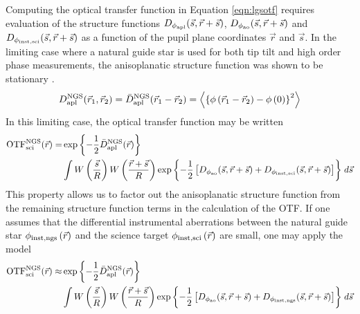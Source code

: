 Computing the optical transfer function in Equation \ref{eqn:lgsotf}
requires evaluation of the structure functions 
$D_{\rm \phi_{apl}}(\vec{s},\vec{r} + \vec{s})$, 
$D_{\rm \phi_{ao}}(\vec{s},\vec{r} + \vec{s})$ and
$D_{\rm \phi_{inst,sci}}(\vec{s},\vec{r} + \vec{s})$ as
a function of the pupil plane coordinates $\vec{r}$ and
$\vec{s}$.  In the limiting case where a natural
guide star is used for both tip tilt and high order phase
measurements, the anisoplanatic structure function was shown to be 
stationary \cite{Britton:2006}.
\begin{equation}
D^{\rm NGS}_{\rm apl}(\vec{r}_{1},\vec{r}_{2}) = 
\bar{D}^{\rm NGS}_{\rm apl}(\vec{r}_{1} - \vec{r}_{2}) =
\left\langle \left\{\phi\left(\vec{r}_{1} - \vec{r}_{2}\right) - 
\phi\left(0\right)\right\}^{2}\right\rangle
\end{equation}
In this limiting case, the optical transfer function may be written 
\begin{equation}\label{eqn:ngsotf}
\begin{aligned}
{\rm OTF}^{\rm NGS}_{\rm sci}(\vec{r}) = 
& \exp{ \left\{ -\frac{1}{2} \bar{D}^{\rm NGS}_{\rm apl}(\vec{r}) \right\} }  \\
& \int 
W \left( \frac{\vec{s}}{R} \right)
W \left( \frac{\vec{r}+\vec{s}}{R} \right) 
\exp{ \left\{ -\frac{1}{2} 
\left[
D_{\rm \phi_{ao}}(\vec{s}, \vec{r} + \vec{s}) + 
D_{\rm \phi_{inst,sci}}(\vec{s}, \vec{r} + \vec{s}) 
\right] \right\} }
\; d\vec{s}
\end{aligned}
\end{equation}
This property allows us to factor out the anisoplanatic structure function
from the remaining structure function terms in the calculation of the
OTF.  If one assumes that the differential
instrumental aberrations between the natural guide star $\phi_{\rm inst,
  ngs}\left(\vec{r}\right)$ and the science target $\phi_{\rm
  inst,sci}\left(\vec{r}\right)$ are small, one may apply the
model
\begin{equation}\label{eqn:ngsapproxotf}
\begin{aligned}
{\rm OTF}^{\rm NGS}_{\rm sci}(\vec{r}) \approx
& \exp{ \left\{ -\frac{1}{2} \bar{D}^{\rm NGS}_{\rm apl}(\vec{r}) \right\} }  \\
& \int 
W \left( \frac{\vec{s}}{R} \right)
W \left( \frac{\vec{r} + \vec{s}}{R} \right) 
\exp{ \left\{ -\frac{1}{2} \left[
D_{\rm \phi_{ao}}(\vec{s}, \vec{r} + \vec{s}) + 
D_{\rm \phi_{inst,ngs}}(\vec{s}, \vec{r} + \vec{s})
\right] \right\} }
\; d\vec{s}
\end{aligned}
\end{equation}
